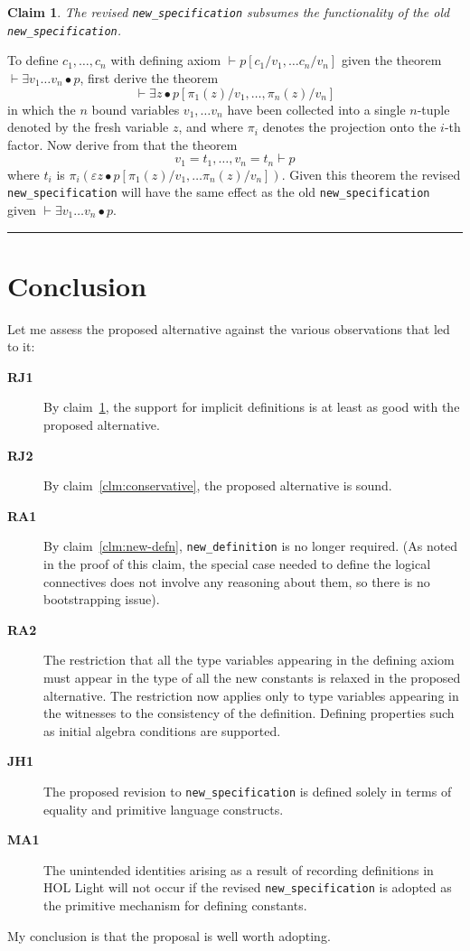 \documentclass[12pt]{article}
\def\JHi{{\bf JH1}}
\def\MAi{{\bf MA1}}
\def\RAi{{\bf RA1}}
\def\RAii{{\bf RA2}}
\def\RJi{{\bf RJ1}}
\def\RJii{{\bf RJ2}}
\def\NewDefn{{\tt new\_definition}}
\def\NewSpec{{\tt new\_specification}}
\def\Done{\hfill\rule{0.5em}{0.5em}}
\newtheorem{Claim}{Claim}
\begin{document}
\begin{Claim}\label{clm:old-new-spec}
The revised {\NewSpec} subsumes the functionality of the old {\NewSpec}.
\end{Claim}
To define $c_1, \ldots, c_n$ with defining axiom $\vdash p[c_1/v_1, \ldots c_n/v_n]$ given the theorem
$\vdash \exists v_1 \ldots v_n \bullet p$, first derive the theorem
$$
\vdash \exists z\bullet p[\pi_1(z)/v_1, \ldots, \pi_n(z)/v_n]
$$
\noindent in which the $n$ bound variables
$v_1, \ldots v_n$ have been collected into a single $n$-tuple denoted by the fresh variable $z$, and where $\pi_i$ denotes the projection onto the $i$-th factor.
Now derive from that  the  theorem
$$
v_1 = t_1, \ldots, v_n = t_n \vdash p
$$
\noindent where $t_i$
is $\pi_i(\varepsilon z\bullet p[\pi_1(z)/v_1, \ldots \pi_n(z)/v_n])$.
Given this theorem the revised {\NewSpec} will have the same effect as the old {\NewSpec}
given $\vdash \exists v_1 \ldots v_n \bullet p$.
\Done

\section{Conclusion}

Let me assess the proposed alternative against the various observations that led to it:

\begin{description}
\item[\RJi] By claim~\ref{clm:old-new-spec}, the support for implicit definitions is at least as good with the proposed alternative.
\item[\RJii] By claim~\ref{clm:conservative}, the proposed alternative is sound.
\item[\RAi] By claim~\ref{clm:new-defn}, {\NewDefn} is no longer required. (As noted in the proof of this claim, the special case needed to define the logical connectives does not involve any reasoning about them, so there is no bootstrapping issue).
\item[\RAii] The restriction that all the type variables appearing in the defining axiom must appear in the type of all the new constants is relaxed in the proposed alternative. The restriction now applies only to type variables appearing in the witnesses to the consistency of the definition. Defining properties such as initial algebra conditions are supported. 
\item[\JHi] The proposed revision to {\NewSpec} is defined solely in terms of equality and primitive language constructs.
\item[\MAi] The unintended identities arising as a result of recording definitions in HOL Light will not occur if the revised {\NewSpec} is adopted as the primitive mechanism for defining constants.
\end{description}

My conclusion is that the proposal is well worth adopting.
\end{document}
